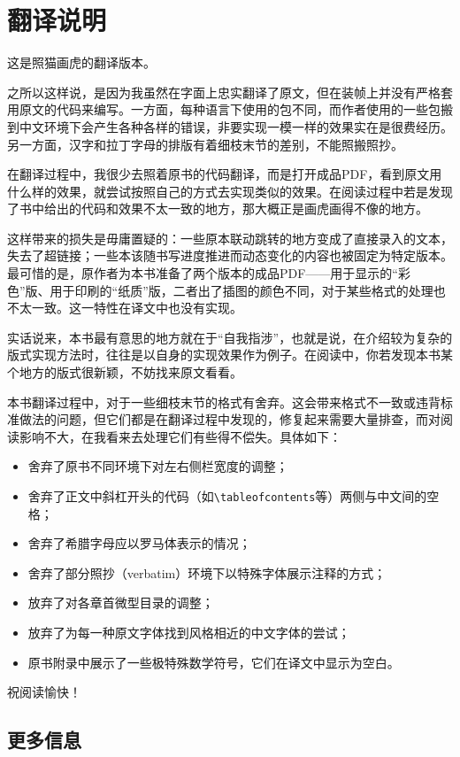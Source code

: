 \chapter*{翻译说明}

这是照猫画虎的翻译版本。

之所以这样说，是因为我虽然在字面上忠实翻译了原文，但在装帧上并没有严格套用原文的代码来编写。一方面，每种语言下使用的包不同，而作者使用的一些包搬到中文环境下会产生各种各样的错误，非要实现一模一样的效果实在是很费经历。另一方面，汉字和拉丁字母的排版有着细枝末节的差别，不能照搬照抄。

在翻译过程中，我很少去照着原书的代码翻译，而是打开成品PDF，看到原文用什么样的效果，就尝试按照自己的方式去实现类似的效果。在阅读过程中若是发现了书中给出的代码和效果不太一致的地方，那大概正是画虎画得不像的地方。

这样带来的损失是毋庸置疑的：一些原本联动跳转的地方变成了直接录入的文本，失去了超链接；一些本该随书写进度推进而动态变化的内容也被固定为特定版本。最可惜的是，原作者为本书准备了两个版本的成品PDF——用于显示的“彩色”版、用于印刷的“纸质”版，二者出了插图的颜色不同，对于某些格式的处理也不太一致。这一特性在译文中也没有实现。

实话说来，本书最有意思的地方就在于“自我指涉”，也就是说，在介绍较为复杂的版式实现方法时，往往是以自身的实现效果作为例子。在阅读中，你若发现本书某个地方的版式很新颖，不妨找来原文看看。

本书翻译过程中，对于一些细枝末节的格式有舍弃。这会带来格式不一致或违背标准做法的问题，但它们都是在翻译过程中发现的，修复起来需要大量排查，而对阅读影响不大，在我看来去处理它们有些得不偿失。具体如下：
\begin{itemize}
    \item 舍弃了原书不同环境下对左右侧栏宽度的调整；
    \item 舍弃了正文中斜杠开头的代码（如\verb+\tableofcontents+等）两侧与中文间的空格；
    \item 舍弃了希腊字母应以罗马体表示的情况；
    \item 舍弃了部分照抄（verbatim）环境下以特殊字体展示注释的方式；
    \item 放弃了对各章首微型目录的调整；
    \item 放弃了为每一种原文字体找到风格相近的中文字体的尝试；
    \item 原书附录中展示了一些极特殊数学符号，它们在译文中显示为空白。
\end{itemize}

祝阅读愉快！

\section*{更多信息}

